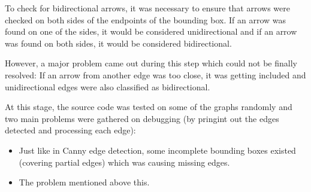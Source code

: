 \documentclass{article}
\begin{document}
To check for bidirectional arrows, it was necessary to ensure that arrows were checked on both sides of the endpoints of the bounding box. If an arrow was found on one of the sides, it would be considered unidirectional and if an arrow was found on both sides, it would be considered bidirectional.

However, a major problem came out during this step which could not be finally resolved: If an arrow from another edge was too close, it was getting included and unidirectional edges were also classified as bidirectional.

At this stage, the source code was tested on some of the graphs randomly and two main problems were gathered on debugging (by pringint out the edges detected and processing each edge):

\begin{itemize}
    \item Just like in Canny edge detection, some incomplete bounding boxes existed (covering partial edges) which was causing missing edges.
    \item  The problem mentioned above this.
\end{itemize}
\end{document}
